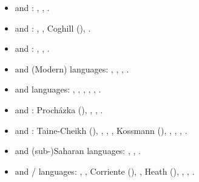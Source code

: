 \documentclass[output=paper]{langsci/langscibook}
\begin{document}
\begin{itemize}[noitemsep,leftmargin=11pt]
\item[\adfhalfrightarrowhead] and : \citet{Retsö2011}, \citet{Weninger2011Aramaic}, \citet{Owens2016Aramaic}.

\item[\adfhalfrightarrowhead] and :
\citet{ArnoldBehnstedt1993}, \citet{Arnold2007}, Coghill (\citeyear{Coghill2010,Coghill2012,Coghill2015}), \citet{Jastrow2015}.

\item[\adfhalfrightarrowhead] and :
\citet{Blau1981}, \citet{Yoda2013}, \citet{Horesh2015}.

\item[\adfhalfrightarrowhead] and (Modern)  languages: \citet{Diem1979}, \citet{Lonnet2011}, \citet{Zammit2011}, \citet{Watson2018}.

\item[\adfhalfrightarrowhead] and  languages: \citet{Tsabolov1994}, \citet{Matras2007Domari}, \citet{Asbaghi2011}, \citet{Gazsi2011}, \citet{WalAnonby2015}, \citet{Herin2018}.

\item[\adfhalfrightarrowhead] and : Procházka (\citeyear{Procházka2002Adana,Procházka2011Turkish}), \citet{Haig2014}, \citet{Taylan2017}, \citet{AkkusBenmamoun2018}.


\item[\adfhalfrightarrowhead] and : Taine-Cheikh (\citeyear{Taine-Cheikh1997Zenaga,Taine-Cheikh2018quadri}), \citet{Brahimi2000}, \citet{Corriente2002}, \citet{LafkiouiBrugnatelli2008}, Kossmann
(\citeyear{Kossmann2009,Kossmann2010,Kossmann2013book}), \citet{ElAissati2011}, \citet{Lafkioui2013reinventing}, \citet{Souag2013book},  \citet{vanPuttenSouag2015}.

\item[\adfhalfrightarrowhead] and (sub-)Saharan languages: \citet{Owens2000article,Owens2015}, \citet{Lafkioui2013book}, \citet{Souag2016sahara}.


\item[\adfhalfrightarrowhead] and / languages: \citet{Brunot1949}, \citet{Benoliel1977}, Corriente (\citeyear{Corriente1978,Corriente1992book}), \citet{Talmoudi1986}, Heath (\citeyear{Heath1989,Heath2015}), \citet{Cifoletti1994}, \citet{Vicente2006}, \citet{Sayahi2014}.


\end{itemize}
\end{document}
